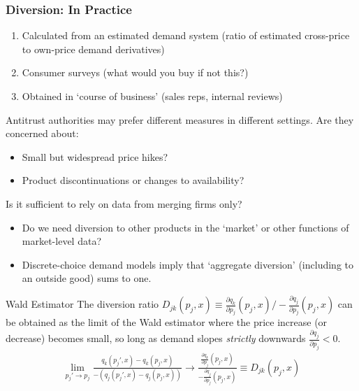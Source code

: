 \documentclass[aspectratio=169,10pt]{beamer}
\begin{document}
\begin{frame}
\frametitle{Diversion: In Practice}
\begin{enumerate}
\item Calculated from an estimated demand system (ratio of estimated cross-price to own-price demand derivatives)
\item Consumer surveys (what would you buy if not this?)
\item Obtained in `course of business' (sales reps, internal reviews)
\end{enumerate}
Antitrust authorities may prefer different measures in different settings. Are they concerned about:
\begin{itemize}
\item Small but widespread price hikes?
\item Product discontinuations or changes to availability?
\end{itemize}
Is it sufficient to rely on data from merging firms only?
\begin{itemize}
\item Do we need diversion to other products in the `market' or other functions of market-level data?
\item Discrete-choice demand models imply that `aggregate diversion' (including to an outside good) sums to one.
\end{itemize}
\end{frame}


\begin{frame}{Wald Estimator}
The diversion ratio $D_{jk}(p_j,x) \equiv\frac{\partial q_k}{\partial p_j}(p_j,x)/-\frac{\partial q_j}{\partial p_j}(p_j,x)$ can be obtained as the limit of the Wald estimator where the price increase (or decrease) becomes small, so long as demand slopes \textit{strictly} downwards $\frac{\partial q_j}{\partial p_j} <0$.
\begin{align*}                               
\lim_{p_j' \rightarrow p_j} \frac{q_k(p_j',x) - q_k(p_j,x)}{-(q_j(p_j',x) - q_j(p_j,x))} \rightarrow \frac{\frac{\partial q_k}{\partial p_j}(p_j,x)}{-\frac{\partial q_j}{\partial p_j}(p_j,x)} \equiv D_{jk}(p_j,x)
\end{align*}
\end{frame}
\end{document}
